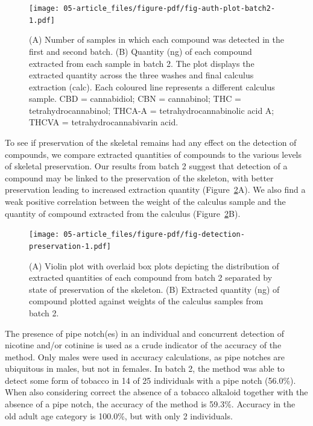 \documentclass[
  letterpaper,
]{book}
\begin{document}
\begin{figure}

{\centering \texttt{[image: 05-article\_files/figure-pdf/fig-auth-plot-batch2-1.pdf]}

}

\caption{\label{fig-auth-plot-batch2}(A) Number of samples in which each
compound was detected in the first and second batch. (B) Quantity (ng)
of each compound extracted from each sample in batch 2. The plot
displays the extracted quantity across the three washes and final
calculus extraction (calc). Each coloured line represents a different
calculus sample. CBD = cannabidiol; CBN = cannabinol; THC =
tetrahydrocannabinol; THCA-A = tetrahydrocannabinolic acid A; THCVA =
tetrahydrocannabivarin acid.}

\end{figure}

To see if preservation of the skeletal remains had any effect on the
detection of compounds, we compare extracted quantities of compounds to
the various levels of skeletal preservation. Our results from batch 2
suggest that detection of a compound may be linked to the preservation
of the skeleton, with better preservation leading to increased
extraction quantity (Figure~\ref{fig-detection-preservation}A). We also
find a weak positive correlation between the weight of the calculus
sample and the quantity of compound extracted from the calculus
(Figure~\ref{fig-detection-preservation}B).

\begin{figure}

{\centering \texttt{[image: 05-article\_files/figure-pdf/fig-detection-preservation-1.pdf]}

}

\caption{\label{fig-detection-preservation}(A) Violin plot with overlaid
box plots depicting the distribution of extracted quantities of each
compound from batch 2 separated by state of preservation of the
skeleton. (B) Extracted quantity (ng) of compound plotted against
weights of the calculus samples from batch 2.}

\end{figure}

The presence of pipe notch(es) in an individual and concurrent detection
of nicotine and/or cotinine is used as a crude indicator of the accuracy
of the method. Only males were used in accuracy calculations, as pipe
notches are ubiquitous in males, but not in females. In batch 2, the
method was able to detect some form of tobacco in 14 of 25 individuals
with a pipe notch (56.0\%). When also considering correct the absence of
a tobacco alkaloid together with the absence of a pipe notch, the
accuracy of the method is 59.3\%. Accuracy in the old adult age category
is 100.0\%, but with only 2 individuals.
\end{document}
